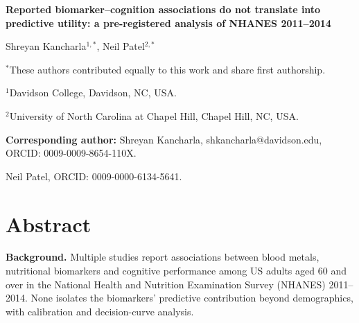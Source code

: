 \documentclass[12pt]{article}
\title{}
\date{}
\begin{document}
\linenumbers

\begin{singlespace}
\begin{center}
{\Large\bfseries Reported biomarker--cognition associations do not translate into predictive utility: a pre-registered analysis of NHANES 2011--2014\par}
\end{center}

\bigskip

\begin{center}
Shreyan Kancharla$^{1,\ast}$, Neil Patel$^{2,\ast}$
\end{center}

\medskip

\noindent $^{\ast}$These authors contributed equally to this work and share first authorship.

\medskip

\noindent $^{1}$Davidson College, Davidson, NC, USA.

\noindent $^{2}$University of North Carolina at Chapel Hill, Chapel Hill, NC, USA.

\medskip

\noindent \textbf{Corresponding author:} Shreyan Kancharla, shkancharla@davidson.edu, ORCID: 0009-0009-8654-110X.

\noindent Neil Patel, ORCID: 0009-0000-6134-5641.

\end{singlespace}

\clearpage

\doublespacing
\section*{Abstract}

\textbf{Background.} Multiple studies report associations between blood metals, nutritional biomarkers and cognitive performance among US adults aged 60 and over in the National Health and Nutrition Examination Survey (NHANES) 2011--2014. None isolates the biomarkers' predictive contribution beyond demographics, with calibration and decision-curve analysis.
\end{document}
